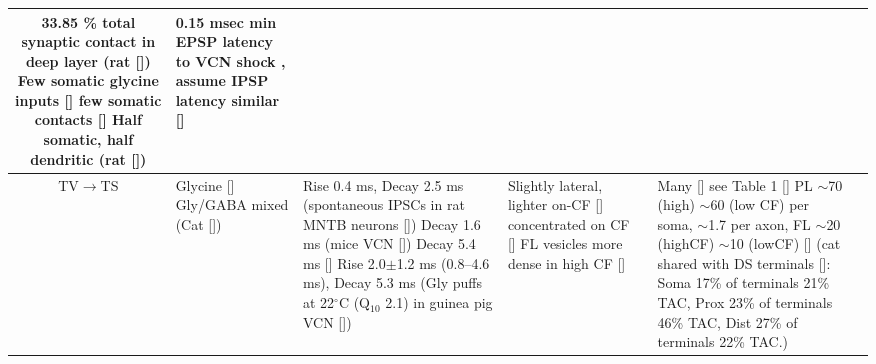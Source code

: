 \begin{longtable}{cYYYYYY}
33.85 \% total synaptic contact in deep layer (rat [])
Few somatic glycine inputs [] 
few  somatic contacts []                   
Half somatic, half dendritic (rat [])
                                & 
0.15 msec min EPSP latency to VCN shock , assume IPSP latency similar
[]\\ \midrule
TV\ensuremath{\rightarrow}TS                        
                                & %
Glycine []
Gly\slash GABA mixed (Cat [])                  
                                & %
Rise 0.4 ms, Decay 2.5 ms (spontaneous IPSCs in rat MNTB neurons [])
Decay 1.6 ms (mice VCN [])
Decay 5.4 ms []    
Rise 2.0$\pm$1.2 ms (0.8--4.6 ms), Decay 5.3 ms (Gly puffs at 22$^\circ$C (Q$_{10}$ 2.1) in  guinea pig VCN [])
                                & %
Slightly lateral, lighter on-CF [] 
concentrated on CF [] 
FL vesicles more dense in high CF []                        
                                & %
                                & %
Many [] see
Table 1 [] 
PL $\sim$70 (high) $\sim$60 (low CF) per soma,
$\sim$1.7 per axon, 
FL $\sim$20 (highCF) $\sim$10 (lowCF)  []                        
(cat shared with DS terminals []: 
Soma 17\% of terminals 21\% TAC,
Prox 23\% of terminals 46\% TAC,
Dist 27\% of terminals 22\% TAC.)



\end{longtable}
